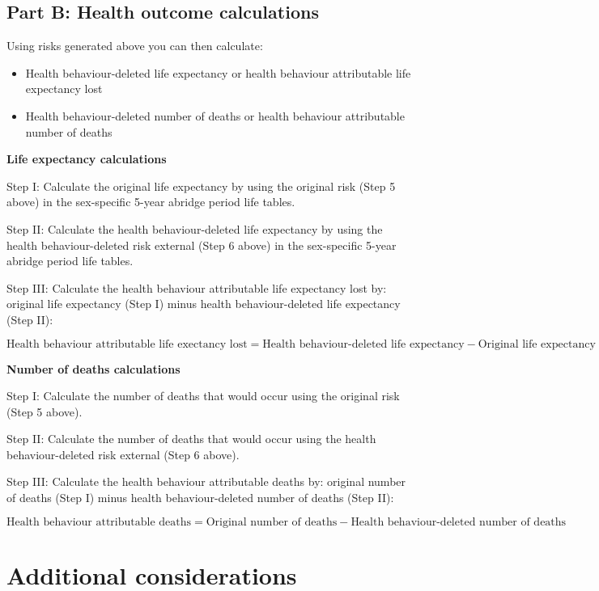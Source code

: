 \documentclass[]{book}
\providecommand{\tightlist}{%
  \setlength{\itemsep}{0pt}\setlength{\parskip}{0pt}}
\begin{document}
\subsection{Part B: Health outcome
calculations}\label{part-b-health-outcome-calculations}

Using risks generated above you can then calculate:

\begin{itemize}
\tightlist
\item
  Health behaviour-deleted life expectancy or health behaviour
  attributable life expectancy lost
\item
  Health behaviour-deleted number of deaths or health behaviour
  attributable number of deaths
\end{itemize}

\textbf{Life expectancy calculations}

Step I: Calculate the original life expectancy by using the original
risk (Step 5 above) in the sex-specific 5-year abridge period life
tables.

Step II: Calculate the health behaviour-deleted life expectancy by using
the health behaviour-deleted risk external (Step 6 above) in the
sex-specific 5-year abridge period life tables.

Step III: Calculate the health behaviour attributable life expectancy
lost by: original life expectancy (Step I) minus health
behaviour-deleted life expectancy (Step II):

\[ \text{Health behaviour attributable life exectancy lost} = \text{Health behaviour-deleted life expectancy} - \text{Original life expectancy}\]

\textbf{Number of deaths calculations}

Step I: Calculate the number of deaths that would occur using the
original risk (Step 5 above).

Step II: Calculate the number of deaths that would occur using the
health behaviour-deleted risk external (Step 6 above).

Step III: Calculate the health behaviour attributable deaths by:
original number of deaths (Step I) minus health behaviour-deleted number
of deaths (Step II):

\[\text{Health behaviour attributable deaths} = \text{Original number of deaths} - \text{Health behaviour-deleted number of deaths}\]

\section{Additional considerations}\label{additional-considerations}
\end{document}
